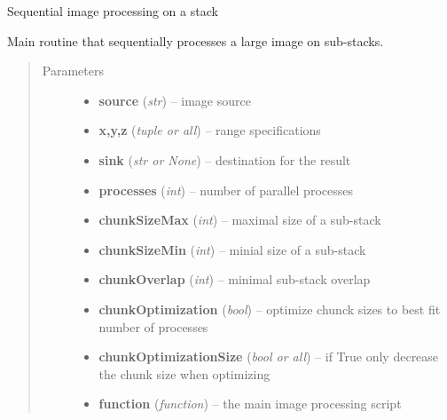 \documentclass[letterpaper,10pt,english]{sphinxmanual}
\begin{document}
\begin{fulllineitems}
\label{api/ClearMap.ImageProcessing:ClearMap.ImageProcessing.StackProcessing.sequentiallyProcessStack}
Sequential image processing on a stack

Main routine that sequentially processes a large image on sub-stacks.
\begin{quote}\begin{description}
\item[{Parameters}] \leavevmode\begin{itemize}
\item {} 
\textbf{source} (\emph{str}) --
image source

\item {} 
\textbf{x,y,z} (\emph{tuple or all}) --
range specifications

\item {} 
\textbf{sink} (\emph{str or None}) --
destination for the result

\item {} 
\textbf{processes} (\emph{int}) --
number of parallel processes

\item {} 
\textbf{chunkSizeMax} (\emph{int}) --
maximal size of a sub-stack

\item {} 
\textbf{chunkSizeMin} (\emph{int}) --
minial size of a sub-stack

\item {} 
\textbf{chunkOverlap} (\emph{int}) --
minimal sub-stack overlap

\item {} 
\textbf{chunkOptimization} (\emph{bool}) --
optimize chunck sizes to best fit number of processes

\item {} 
\textbf{chunkOptimizationSize} (\emph{bool or all}) --
if True only decrease the chunk size when optimizing

\item {} 
\textbf{function} (\emph{function}) --
the main image processing script


\end{itemize}
\end{description}
\end{quote}
\end{fulllineitems}
\end{document}
